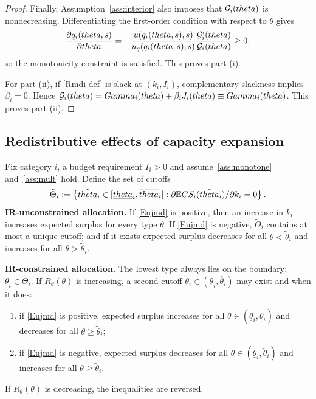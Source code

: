 \documentclass[master.tex]{subfiles}
\begin{document}
\begin{proof}
Finally, Assumption~\ref{ass:interior} also imposes that \(\mathcal{G}_i(theta)\) is nondecreasing. Differentiating the first-order condition with respect to \(\theta\) gives
\[
\frac{\partial q_i(theta,s)}{\partial theta}
=
-
\frac{u\!\left(q_i(theta,s),s\right)}{u_q\!\left(q_i(theta,s),s\right)}
\frac{\mathcal{G}_i'(theta)}{\mathcal{G}_i(theta)}
\ge 0,
\]
so the monotonicity constraint is satisfied. This proves part (i).

For part (ii), if \eqref{Rmdi-def} is slack at \((k_i,I_i)\), complementary slackness implies \(\beta_i=0\). Hence $\mathcal{G}_i(theta)=Gamma_i(theta)+\beta_i J_i(theta)\equiv Gamma_i(theta)$. This proves part (ii).
\end{proof}
\subsection{Redistributive effects of capacity expansion}

\begin{theorem}\label{thm:surplus}
Fix category \(i\), a budget requirement \(I_i>0\) and assume~\ref{ass:monotone} and~\ref{ass:mult} hold. Define the set of cutoffs 
\[\tilde\Theta_i := \left\{\tilde{theta}_i\in[\underline{theta}_i,\overline{theta}_i] : \partial\mathbb{E} CS_i(\tilde{theta}_i)/\partial k_i=0\right\}.\]
\noindent\textbf{IR-unconstrained allocation.} If \eqref{Eujmd} is positive, then an increase in \(k_i\) increases expected surplus for every type \(\theta\). If \eqref{Eujmd} is negative, \(\tilde\Theta_i\) contains at most a unique cutoff; and if it exists expected surplus decreases for all \(\theta<\tilde\theta_i\) and increases for all \(\theta>\tilde\theta_i\).

\noindent\textbf{IR-constrained allocation.} The lowest type always lies on the boundary: \(\underline\theta_i\in\tilde\Theta_i\). If \(R_\theta(\theta)\) is increasing, a second cutoff \(\tilde\theta_i\in(\underline\theta_i,\overline\theta_i)\) may exist and when it does:
\begin{enumerate}[label=(\roman*), leftmargin=1cm]
    \item if \eqref{Eujmd} is positive, expected surplus increases for all \(\theta\in(\underline\theta_i,\tilde\theta_i)\) and decreases for all \(\theta\ge\tilde\theta_i\);
    \item if \eqref{Eujmd} is negative, expected surplus decreases for all \(\theta\in(\underline\theta_i,\tilde\theta_i)\) and increases for all \(\theta\ge\tilde\theta_i\).
\end{enumerate}
If \(R_\theta(\theta)\) is decreasing, the inequalities are reversed.
\end{theorem}
\end{document}
